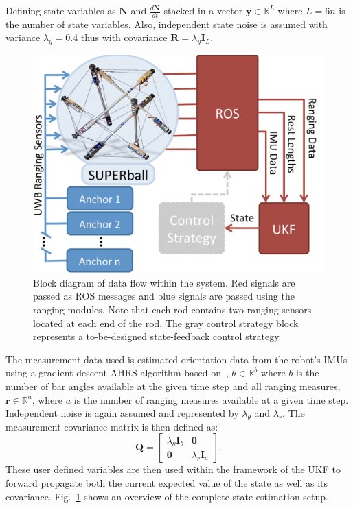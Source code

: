 {Defining state variables as $\boldsymbol{N}$ and $\frac{d\boldsymbol{N}}{dt}$ stacked in a vector $\boldsymbol{y}\in\mathbb{R}^{L}$ where $L = 6n$ is the number of state variables. 
Also, independent state noise is assumed with variance $\lambda_y = 0.4$ thus with covariance $\boldsymbol{R} = \lambda_y\bm{I}_L$.

\begin{figure}[tpbh]
 \centering
  \includegraphics[width=0.7\linewidth]{tex/img/flow_chartSB.pdf}
 \caption{Block diagram of data flow within the system. Red signals are passed as ROS messages and blue signals are passed using the ranging modules. Note that each rod contains two ranging sensors located at each end of the rod. The gray control strategy block represents a to-be-designed state-feedback control strategy.}
\label{fig:UKFflowChart}
 \end{figure}

The measurement data used is estimated orientation data from the robot's IMUs using a gradient descent AHRS algorithm based on~\cite{madgwick2011estimation}, $\theta\in\mathbb{R}^{b}$ where $b$ is the number of bar angles available at the given time step and all ranging measures, $\boldsymbol{r}\in\mathbb{R}^{a}$, where $a$ is the number of ranging measures available at a given time step.
Independent noise is again assumed and represented by $\lambda_\theta$ and $\lambda_r$. 
The measurement covariance matrix is then defined as:
$$
\boldsymbol{Q} =  \left[ \begin{array}{ccc} \lambda_\theta\bm{I}_b & \boldsymbol{0} \\
                         \boldsymbol{0}        & \lambda_r\bm{I}_a  \end{array} \right].
$$
These user defined variables are then used within the framework of the UKF to forward propagate both the current expected value of the state as well as its covariance. 
Fig.~\ref{fig:UKFflowChart} shows an overview of the complete state estimation setup. 

}
